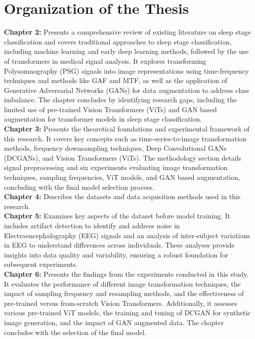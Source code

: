 \section{Organization of the Thesis }

\textbf{Chapter 2:} Presents a comprehensive review of existing literature on sleep stage classification and covers traditional approaches to sleep stage classification, including machine learning and early deep learning methods, followed by the use of transformers in medical signal analysis. It explores transforming Polysomnography (PSG) signals into image representations using time-frequency techniques and methods like \ac{GAF} and \ac{MTF}, as well as the application of Generative Adversarial Networks (GANs) for data augmentation to address class imbalance. The chapter concludes by identifying research gaps, including the limited use of pre-trained Vision Transformers (ViTs) and GAN based augmentation for transformer models in sleep stage classification. \\

\textbf{Chapter 3:} Presents the theoretical foundations and experimental framework of this research. It covers key concepts such as time-series-to-image transformation methods, frequency downsampling techniques, Deep Convolutional GANs (DCGANs), and Vision Transformers (ViTs). The methodology section details signal preprocessing and six experiments evaluating image transformation techniques, sampling frequencies, ViT models, and GAN based augmentation, concluding with the final model selection process. \\

\textbf{Chapter 4:} Describes the datasets and data acquisition methods used in this research. \\

\textbf{Chapter 5:} Examines key aspects of the dataset before model training. It includes artifact detection to identify and address noise in Electroencephalography (EEG) signals and an analysis of inter-subject variations in EEG to understand differences across individuals. These analyses provide insights into data quality and variability, ensuring a robust foundation for subsequent experiments. \\

\textbf{Chapter 6:} Presents the findings from the experiments conducted in this study. It evaluates the performance of different image transformation techniques, the impact of sampling frequency and resampling methods, and the effectiveness of pre-trained versus from-scratch Vision Transformers. Additionally, it assesses various pre-trained ViT models, the training and tuning of DCGAN for synthetic image generation, and the impact of GAN augmented data. The chapter concludes with the selection of the final model. \\

